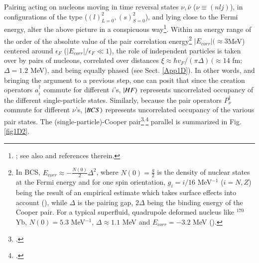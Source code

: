 Pairing acting on nucleons moving in time reversal states $\nu,\bar\nu$ ($\nu\equiv(nlj)$), in configurations of the type ($(l)^2_{L=0},(s)^2_{S=0}$), and lying close to the Fermi energy, alter the above picture in a conspicuous way\footnote{\cite{Bohr:58}; see also \cite{Broglia:13} and references therein.}. Within an energy range of the order of the absolute value of the pair correlation energy\footnote{In BCS, $E_{corr}\approx-\frac{N(0)}{2}\Delta^2$, where $N(0)=\frac{g}{2}$ is the density of nuclear states at the Fermi energy and for one spin orientation, $g_i=i/16$ MeV$^{-1}$ ($i=N,Z$) being the result of an empirical estimate which takes surface effects into account (\cite{Bohr:75,Bortignon:98}), while $\Delta$ is the pairing gap, $2\Delta$ being the binding energy of the Cooper pair. For a typical superfluid, quadrupole deformed nucleus like $^{170}$Yb, $N(0)=5.3$ MeV$^{-1}$, $\Delta\approx1.1$ MeV and $E_{corr}=-3.2$ MeV (\cite{Shimizu:89}).} $|E_{corr}|(\approx 3 $MeV) centered around $\epsilon_F$ ($|E_{corr}|/\epsilon_F\ll1$), the role of independent particles is taken over by  pairs of nucleons, correlated over distances $\xi\approx\hbar v_F/(\pi\Delta)\,(\approx 14$ fm; $\Delta=1.2$ MeV), and being equally phased (see Sect. \ref{App1D}). In other words, and bringing the argument to a previous step, one can posit that since the creation operators $a^\dagger_i$ commute for different $i$'s, $|{HF} \rangle$ represents uncorrelated occupancy of the different single-particle states. Similarly, because the pair operators $P^\dagger_\nu$ commute for different $\nu$'s, $|{BCS} \rangle$ represents uncorrelated occupancy of the various pair states.  The (single-particle)-Cooper pair\footnote{\cite{Cooper:56}.}$^{,}$\footnote{\cite{Brink:05}.} parallel is summarized in Fig. \ref{fig1D2}.


